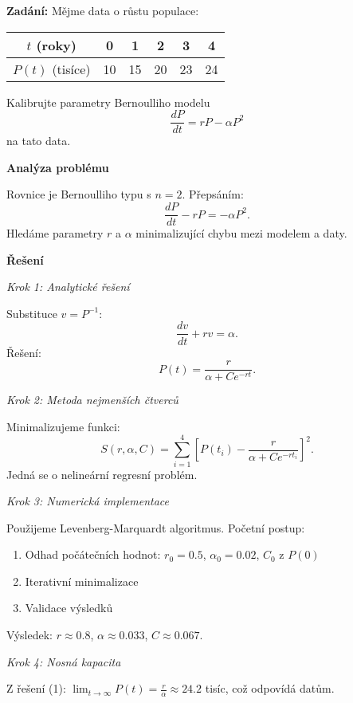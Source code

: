 \begin{example}
\label{ex:d3-kalibrace-modelu}

\noindent\textbf{Zadání:} Mějme data o růstu populace:
\begin{center}
\begin{tabular}{c|ccccc}
$t$ (roky) & 0 & 1 & 2 & 3 & 4 \\
\hline
$P(t)$ (tisíce) & 10 & 15 & 20 & 23 & 24
\end{tabular}
\end{center}
Kalibrujte parametry Bernoulliho modelu
\[
\frac{dP}{dt} = rP - \alpha P^2
\]
na tato data.

\vspace{1.5\baselineskip}

\noindent\textbf{Analýza problému}

\noindent Rovnice je Bernoulliho typu s $n = 2$. Přepsáním:
\[
\frac{dP}{dt} - rP = -\alpha P^2.
\]
Hledáme parametry $r$ a $\alpha$ minimalizující chybu mezi modelem a daty.

\vspace{1.5\baselineskip}

\noindent\textbf{Řešení}

\noindent\textit{Krok 1: Analytické řešení}

Substituce $v = P^{-1}$:
\[
\frac{dv}{dt} + rv = \alpha.
\]
Řešení:
\[
P(t) = \frac{r}{\alpha + Ce^{-rt}}. \tag{1}
\]

\noindent\textit{Krok 2: Metoda nejmenších čtverců}

Minimalizujeme funkci:
\[
S(r, \alpha, C) = \sum_{i=1}^4 \left[ P(t_i) - \frac{r}{\alpha + Ce^{-rt_i}} \right]^2.
\]
Jedná se o nelineární regresní problém.

\noindent\textit{Krok 3: Numerická implementace}

Použijeme Levenberg-Marquardt algoritmus. Početní postup:
\begin{enumerate}
\item Odhad počátečních hodnot: $r_0 = 0.5$, $\alpha_0 = 0.02$, $C_0$ z $P(0)$
\item Iterativní minimalizace
\item Validace výsledků
\end{enumerate}

Výsledek: $r \approx 0.8$, $\alpha \approx 0.033$, $C \approx 0.067$.

\noindent\textit{Krok 4: Nosná kapacita}

Z řešení (1): $\lim_{t \to \infty} P(t) = \frac{r}{\alpha} \approx 24.2$ tisíc,
což odpovídá datům.


\end{example}
